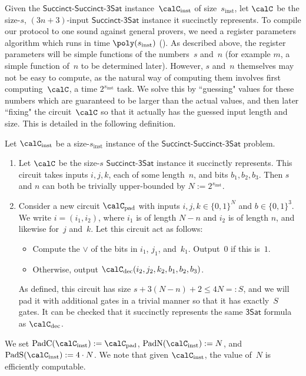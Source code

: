 \documentclass[11pt]{article}
\newcommand{\sat}{\mathsf{3Sat}}
\newcommand{\succinctsquared}{\mathsf{Succinct}\text{-}\mathsf{Succinct}\text{-}\mathsf{3Sat}}
\begin{document}
Given the $\succinctsquared$ instance~$\calC_{\mathrm{inst}}$
of size~$s_{\mathrm{inst}}$,
let $\calC$ be the size-$s$, $(3n+3)$-input $\mathsf{Succinct}$-$\mathsf{3Sat}$ instance it succinctly represents.
To compile our protocol to one sound against general provers,
we need a register parameters algorithm which runs in time $\poly(s_{\mathrm{inst}})$ ().
As described above, the register parameters will be simple functions of the numbers~$s$ and~$n$
(for example $m$, a simple function of~$n$ to be determined later).
However, $s$ and~$n$ themselves may not be easy to compute,
as the natural way of computing them involves first computing~$\calC$,
a time $2^{s_{\mathrm{inst}}}$ task.
We solve this by ``guessing" values for these numbers which are guaranteed to be larger than the actual values,
and then later ``fixing" the circuit~$\calC$ so that it actually has the guessed input length and size.
This is detailed in the following definition.

\begin{definition}\label{def:register-parameters}
Let $\calC_{\mathrm{inst}}$ be a size-$s_{\mathrm{inst}}$ instance of the $\succinctsquared$ problem.
\begin{enumerate}
\item Let $\calC$ be the size-$s$ $\mathsf{Succinct}$-$\mathsf{3Sat}$ instance it succinctly represents.
This circuit takes inputs $i, j, k$, each of some length~$n$, and bits $b_1, b_2, b_3$.
Then $s$ and $n$ can both be trivially upper-bounded by $N := 2^{s_{\mathrm{inst}}}$.
\item Consider a new circuit $\calC_{\mathrm{pad}}$ with inputs $i, j, k \in \{0, 1\}^{N}$ and $b \in \{0, 1\}^3$. We write $i = (i_1, i_2)$, where $i_1$ is of length $N - n$ and $i_2$ is of length $n$, and likewise for~$j$ and~$k$. Let this circuit act as follows:
\begin{itemize}
\item[$\circ$] Compute the $\lor$ of the bits in $i_1$, $j_1$, and~$k_1$. Output~$0$ if this is~$1$.
\item[$\circ$] Otherwise, output $\calC_{\mathrm{dec}}(i_2, j_2, k_2, b_1, b_2, b_3)$.
\end{itemize}
As defined, this circuit has size $s + 3 (N - n) + 2 \leq 4 N =: S$,
and we will pad it with additional gates in a trivial manner so that it has exactly~$S$ gates.
It can be checked that it succinctly represents the same $\sat$ formula as $\calC_{\mathrm{dec}}$.
\end{enumerate}
We set $\mathrm{PadC}(\calC_{\mathrm{inst}}) := \calC_{\mathrm{pad}}$, $\mathrm{PadN}(\calC_{\mathrm{inst}}) := N$,
and $\mathrm{PadS}(\calC_{\mathrm{inst}}):= 4 \cdot N$.
We note that given $\calC_{\mathrm{inst}}$, the value of~$N$ is efficiently computable.
\end{definition}
\end{document}

